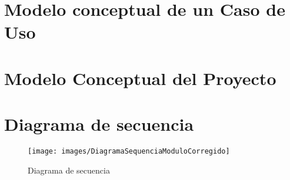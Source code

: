 \section{Modelo conceptual de un Caso de Uso}



\section{Modelo Conceptual del Proyecto}

\newpage
\section{Diagrama de secuencia}

\begin{landscape}
\begin{figure}
	\centering
	\texttt{[image: images/DiagramaSequenciaModuloCorregido]}
	\caption{Diagrama de secuencia}
	\label{fig:ejemplo}
\end{figure}
\end{landscape}